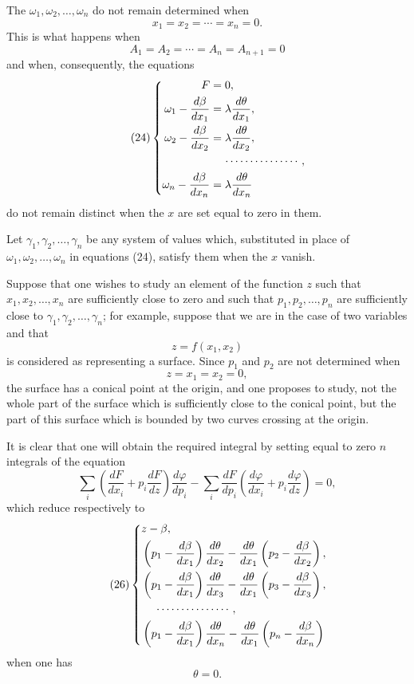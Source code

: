 \documentclass[11pt]{article}
\begin{document}
The $\omega_1,\omega_2,\ldots,\omega_n$ do not remain determined when
\[
x_1=x_2=\cdots=x_n=0.
\]
This is what happens when
\[
A_1=A_2=\cdots=A_n=A_{n+1}=0
\]
and when, consequently, the equations
\begin{equation*}\tag{24}
\left\{
\begin{aligned}
F&=0,\\
\omega_1-\frac{d\beta}{dx_1}&=\lambda\frac{d\theta}{dx_1},\\
\omega_2-\frac{d\beta}{dx_2}&=\lambda\frac{d\theta}{dx_2},\\
&\hspace{1.2em}\cdots\cdots\cdots\cdots\cdots,\\
\omega_n-\frac{d\beta}{dx_n}&=\lambda\frac{d\theta}{dx_n}
\end{aligned}
\right.
\end{equation*}
do not remain distinct when the $x$ are set equal to zero in them.

Let $\gamma_1,\gamma_2,\ldots,\gamma_n$ be any system of values which, substituted in place of $\omega_1,\omega_2,\ldots,\omega_n$ in equations (24), satisfy them when the $x$ vanish.

Suppose that one wishes to study an element of the function $z$ such that $x_1,x_2,\ldots,x_n$ are sufficiently close to zero and such that $p_1,p_2,\ldots,p_n$ are sufficiently close to $\gamma_1,\gamma_2,\ldots,\gamma_n$; for example, suppose that we are in the case of two variables and that
\[
z=f(x_1,x_2)
\]
is considered as representing a surface. Since $p_1$ and $p_2$ are not determined when
\[
z=x_1=x_2=0,
\]
the surface has a conical point at the origin, and one proposes to study, not the whole part of the surface which is sufficiently close to the conical point, but the part of this surface which is bounded by two curves crossing at the origin.

It is clear that one will obtain the required integral by setting equal to zero $n$ integrals of the equation
\begin{equation*}\tag{25}
\sum_i\left(\frac{dF}{dx_i}+p_i\frac{dF}{dz}\right)\frac{d\varphi}{dp_i}
-
\sum_i\frac{dF}{dp_i}\left(\frac{d\varphi}{dx_i}+p_i\frac{d\varphi}{dz}\right)=0,
\end{equation*}
which reduce respectively to
\begin{equation*}\tag{26}
\left\{
\begin{aligned}
&z-\beta,\\
&\left(p_1-\frac{d\beta}{dx_1}\right)\frac{d\theta}{dx_2}
-\frac{d\theta}{dx_1}\left(p_2-\frac{d\beta}{dx_2}\right),\\
&\left(p_1-\frac{d\beta}{dx_1}\right)\frac{d\theta}{dx_3}
-\frac{d\theta}{dx_1}\left(p_3-\frac{d\beta}{dx_3}\right),\\
&\hspace{1.2em}\cdots\cdots\cdots\cdots\cdots,\\
&\left(p_1-\frac{d\beta}{dx_1}\right)\frac{d\theta}{dx_n}
-\frac{d\theta}{dx_1}\left(p_n-\frac{d\beta}{dx_n}\right)
\end{aligned}
\right.
\end{equation*}
when one has
\[
\theta=0.
\]
\end{document}
